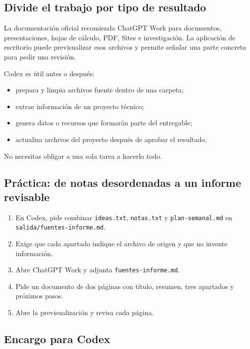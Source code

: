 \documentclass[10pt,a4paper,openany]{book}
\providecommand{\tightlist}{\setlength{\itemsep}{0.18em}\setlength{\parskip}{0pt}}
\begin{document}
\subsection{Divide el trabajo por tipo de
resultado}\label{divide-el-trabajo-por-tipo-de-resultado}

La documentación oficial recomienda ChatGPT Work para documentos,
presentaciones, hojas de cálculo, PDF, Sites e investigación. La
aplicación de escritorio puede previsualizar esos archivos y permite
señalar una parte concreta para pedir una revisión.

Codex es útil antes o después:

\begin{itemize}
\tightlist
\item
  prepara y limpia archivos fuente dentro de una carpeta;
\item
  extrae información de un proyecto técnico;
\item
  genera datos o recursos que formarán parte del entregable;
\item
  actualiza archivos del proyecto después de aprobar el resultado.
\end{itemize}

No necesitas obligar a una sola tarea a hacerlo todo.

\subsection{Práctica: de notas desordenadas a un informe
revisable}\label{pruxe1ctica-de-notas-desordenadas-a-un-informe-revisable}

\begin{enumerate}
\def\labelenumi{\arabic{enumi}.}
\tightlist
\item
  En Codex, pide combinar \texttt{ideas.txt}, \texttt{notas.txt} y
  \texttt{plan-semanal.md} en \texttt{salida/fuentes-informe.md}.
\item
  Exige que cada apartado indique el archivo de origen y que no invente
  información.
\item
  Abre ChatGPT Work y adjunta \texttt{fuentes-informe.md}.
\item
  Pide un documento de dos páginas con título, resumen, tres apartados y
  próximos pasos.
\item
  Abre la previsualización y revisa cada página.
\end{enumerate}

\subsection{Encargo para Codex}\label{encargo-para-codex}
\end{document}
